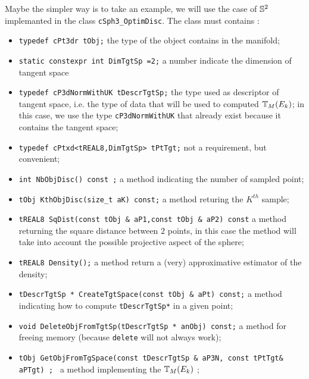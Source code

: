 Maybe the simpler way is to take an example, we will use the case of $\mathbb{S}^2$ 
implemanted in the class {\tt cSph3\_OptimDisc}. The class must contains :

\begin{itemize}
    \item {\tt        typedef cPt3dr tObj;} the type of the object contains in the manifold;

    \item {\tt static constexpr int DimTgtSp =2;}   a number indicate the dimension of tangent space  

    \item {\tt  typedef cP3dNormWithUK  tDescrTgtSp;}  the type used as descriptor of tangent space, i.e. 
          the type of data that will be used to computed  $\mathbb{T}_M(E_k)$; in this case, we use
          the type {\tt cP3dNormWithUK} that already exist because it contains the tangent space;


    \item {\tt  typedef cPtxd<tREAL8,DimTgtSp> tPtTgt;} not a requirement, but convenient;


    \item {\tt int NbObjDisc() const ;} a method indicating the  number of sampled point;

    \item {\tt   tObj KthObjDisc(size\_t aK) const;} a method returing the  $K^{th}$ sample;

    \item   {\tt  tREAL8 SqDist(const tObj \& aP1,const tObj \& aP2) const} a method returning
          the square distance between $2$ points, in this case the method will take into account
          the possible projective aspect of the sphere;


    \item   {\tt   tREAL8 Density();} a method return a (very) approximative estimator of the density;

    \item   {\tt   tDescrTgtSp * CreateTgtSpace(const tObj \& aPt) const;} a method indicating
           how to compute  {\tt tDescrTgtSp*} in a given point;

    \item   {\tt          void DeleteObjFromTgtSp(tDescrTgtSp * anObj) const;} a method
            for freeing memory (because {\tt delete} will not always work);

    \item   {\tt  tObj GetObjFromTgSpace(const tDescrTgtSp \& aP3N, const tPtTgt\& aPTgt) ; } a method
             implementing the $\mathbb{T}_M(E_k)$ ;

\end{itemize}

